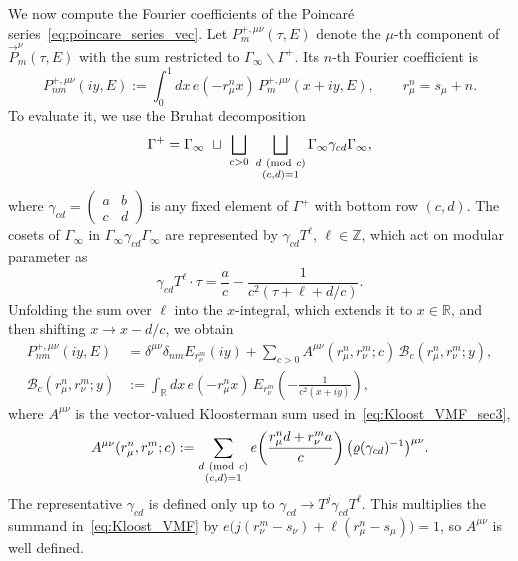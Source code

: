 \documentclass[11pt]{article}
\numberwithin{equation}{section}
\begin{document}
We now compute the Fourier coefficients of the Poincar\'e
series~\eqref{eq:poincare_series_vec}. Let $P_m^{+,\mu\nu}(\tau,E)$ denote the $\mu$-th
component of $\vec P_m^\nu(\tau,E)$ with the sum restricted to
$\Gamma_\infty\backslash\Gamma^+$. Its $n$-th Fourier coefficient is
\begin{equation}
  P_{nm}^{+,\mu\nu}(iy,E)
  :=\int_0^1dx\,e(-r_\mu^n x)\,P_m^{+,\mu\nu}(x+iy,E),
  \qquad r_\mu^n=s_\mu+n.
\end{equation}
To evaluate it, we use the Bruhat decomposition
\begin{equation}
  \Gamma^+
  =\Gamma_\infty\ \sqcup\
  \bigsqcup_{c>0}\ \bigsqcup_{\substack{d\ ({\rm mod}\ c)\\(c,d)=1}}
  \Gamma_\infty\gamma_{cd}\Gamma_\infty,
  \label{eq:Bruhat_decomp}
\end{equation}
where $\gamma_{cd}=\left(\begin{smallmatrix}a&b\\c&d\end{smallmatrix}\right)$ is any
fixed element of $\Gamma^+$ with bottom row $(c,d)$. The cosets of $\Gamma_\infty$ in
$\Gamma_\infty\gamma_{cd}\Gamma_\infty$ are represented by $\gamma_{cd}T^\ell$,
$\ell\in\mathbb Z$, which act on modular parameter as
\begin{equation}
  \gamma_{cd}T^\ell\cdot\tau=\frac ac-\frac{1}{c^2(\tau+\ell+d/c)}.
\end{equation}
Unfolding the sum over $\ell$ into the $x$-integral, which extends it to
$x\in\mathbb R$, and then shifting $x\to x-d/c$, we obtain
\begin{equation}
\begin{aligned}
  P_{nm}^{+,\mu\nu}(iy,E)
  &=\delta^{\mu\nu}\delta_{nm}E_{r_\nu^m}(iy)
    +\sum_{c>0}A^{\mu\nu}(r_\mu^n,r_\nu^m;c)\,
      \mathcal B_c(r_\mu^n,r_\nu^m;y),\\
  \mathcal B_c(r_\mu^n,r_\nu^m;y)
  &:=\int_{\mathbb R}dx\,e(-r_\mu^n x)\,
  E_{r_\nu^m}\!\left(-\frac1{c^2(x+iy)}\right),
\end{aligned}
\label{eq:PS_Fourier}
\end{equation}
where $A^{\mu\nu}$ is the vector-valued Kloosterman sum used
in~\eqref{eq:Kloost_VMF_sec3},
\begin{equation}
  A^{\mu\nu}(r_\mu^n,r_\nu^m;c)
  :=\sum_{\substack{d\ ({\rm mod}\ c)\\(c,d)=1}}
  e\!\left(\frac{r_\mu^n d+r_\nu^m a}{c}\right)
  \bigl(\varrho(\gamma_{cd})^{-1}\bigr)^{\mu\nu}.
  \label{eq:Kloost_VMF}
\end{equation}
The representative $\gamma_{cd}$ is defined only up to
$\gamma_{cd}\to T^j\gamma_{cd}T^\ell$. This multiplies the summand
in~\eqref{eq:Kloost_VMF} by $e\bigl(j(r_\nu^m-s_\nu)+\ell(r_\mu^n-s_\mu)\bigr)=1$, so
$A^{\mu\nu}$ is well defined.
\end{document}
